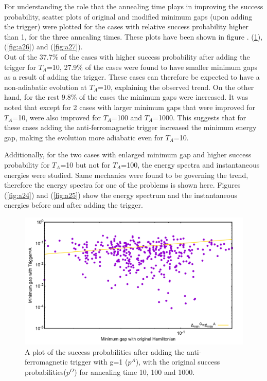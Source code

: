 \documentclass[../main.tex]{subfiles}
\begin{document}
For understanding the role that the annealing time plays in improving the success probability, scatter plots of original and modified minimum gaps (upon adding the trigger) were plotted for the cases with relative success probability higher than 1, for the three annealing times. These plots have been shown in figure .
(\ref{fig:a23}), (\ref{fig:a26}) and (\ref{fig:a27}).\\

Out of the 37.7\% of the cases with higher success probability after adding the trigger for $T_A$=10, 27.9\% of the cases were found to have smaller minimum gaps as a result of adding the trigger. These cases can therefore be expected to have a non-adiabatic evolution at $T_A$=10, explaining the observed trend. On the other hand, for the rest 9.8\% of the cases the minimum gaps were increased. It was noted that except for 2 cases with larger minimum gaps that were improved for $T_A$=10, were also improved for $T_A$=100 and $T_A$=1000. This suggests that for these cases adding the anti-ferromagnetic trigger increased the minimum energy gap, making the evolution more adiabatic even for $T_A$=10. 

Additionally, for the two cases with enlarged minimum gap and higher success probability for $T_A$=10 but not for $T_A$=100, the energy spectra and instantaneous energies were studied. Same mechanics were found to be governing the trend, therefore the energy spectra for one of the problems is shown here. Figures (\ref{fig:a24}) and (\ref{fig:a25}) show the energy spectrum and the instantaneous energies before and after adding the trigger.

\begin{figure}[H]
\centering 
\includegraphics[scale=0.26]{selected_T10_g1.png}
\caption{A plot of the success probabilities after adding the anti-ferromagnetic trigger with g=1 ($p^A$), with the original success probabilities($p^O$) for annealing time 10, 100 and 1000.}
\label{fig:a23}
\end{figure}
\end{document}
